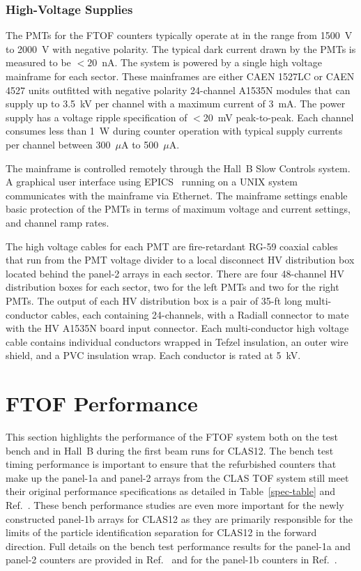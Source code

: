 \documentclass{elsart}
\begin{document}
\subsubsection{High-Voltage Supplies}

The PMTs for the FTOF counters typically operate at in the range from 1500~V to 2000~V with negative
polarity. The typical dark current drawn by the PMTs is measured to be $<20$~nA. The system is powered
by a single high voltage mainframe for each sector. These mainframes are either CAEN 1527LC or CAEN 4527
units outfitted with negative polarity 24-channel A1535N modules that can supply up to 3.5~kV per channel with
a maximum current of 3~mA. The power supply has a voltage ripple specification of $<$20~mV peak-to-peak.
Each channel consumes less than 1~W during counter operation with typical supply currents per channel between
300~$\mu$A to 500~$\mu$A.

The mainframe is controlled remotely through the Hall~B Slow Controls system. A graphical user interface
using EPICS~\cite{epics} running on a UNIX system communicates with the mainframe via Ethernet. The
mainframe settings enable basic protection of the PMTs in terms of maximum voltage and current settings,
and channel ramp rates.

The high voltage cables for each PMT are fire-retardant RG-59 coaxial cables that run from the PMT
voltage divider to a local disconnect HV distribution box located behind the panel-2 arrays in each
sector. There are four 48-channel HV distribution boxes for each sector, two for the left PMTs and two
for the right PMTs. The output of each HV distribution box is a pair of 35-ft long multi-conductor cables,
each containing 24-channels, with a Radiall connector to mate with the HV A1535N board input connector.
Each multi-conductor high voltage cable contains individual conductors wrapped in Tefzel insulation, an outer
wire shield, and a PVC insulation wrap. Each conductor is rated at 5~kV.

\section{FTOF Performance}
\label{sec:performance}

This section highlights the performance of the FTOF system both on the test bench and in Hall~B during
the first beam runs for CLAS12. The bench test timing performance is important to ensure that the
refurbished counters that make up the panel-1a and panel-2 arrays from the CLAS TOF system still meet
their original performance specifications as detailed in Table~\ref{spec-table} and Ref.~\cite{tof-nim}. These
bench performance studies are even more important for the newly constructed panel-1b arrays for CLAS12
as they are primarily responsible for the limits of the particle identification separation for CLAS12 in the
forward direction. Full details on the bench test performance results for the panel-1a and panel-2 counters
are provided in Ref.~\cite{dsc-cn2013-001} and for the panel-1b counters in Ref.~\cite{nim-p1b}.
\end{document}
